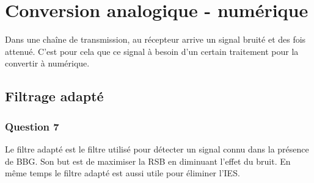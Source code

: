 \documentclass[a4paper,11pt]{article}
\begin{document}
\section{Conversion analogique - numérique}
Dans une chaîne de transmission, au récepteur arrive un signal bruité et des fois attenué. C'est pour cela que ce signal à besoin d'un certain traitement pour la convertir à numérique.

\subsection{Filtrage adapté}
\subsubsection*{Question 7}
Le filtre adapté est le filtre utilisé pour détecter un signal connu dans la présence de BBG. Son but est de maximiser la RSB en diminuant l'effet du bruit. En même temps le filtre adapté est aussi utile pour éliminer l'IES.
\end{document}
